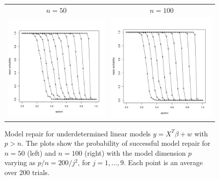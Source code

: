 \documentclass[12pt,pdftex,noinfoline]{imsart}
\numberwithin{equation}{section}
\theoremstyle{remark}
\begin{document}
\begin{figure}[ht]
  \begin{center}
    \begin{tabular}{cc}
      $n=50$ & $n=100$\\[-20pt]
      \includegraphics[width=.47\textwidth]{repair-n50} &
      \includegraphics[width=.47\textwidth]{repair-n100}\\[-10pt]
    \end{tabular}
  \end{center}
\caption{Model repair for underdetermined linear models $y=X^T\beta + w$ with $p>n$. The plots show the probability of successful model repair for $n=50$ (left) and $n=100$ (right) with the model dimension $p$
varying as $p/n = 200 /j^2$, for $j=1,\ldots, 9$. Each point is an average over 200 trials.}
\end{figure}
\end{document}
